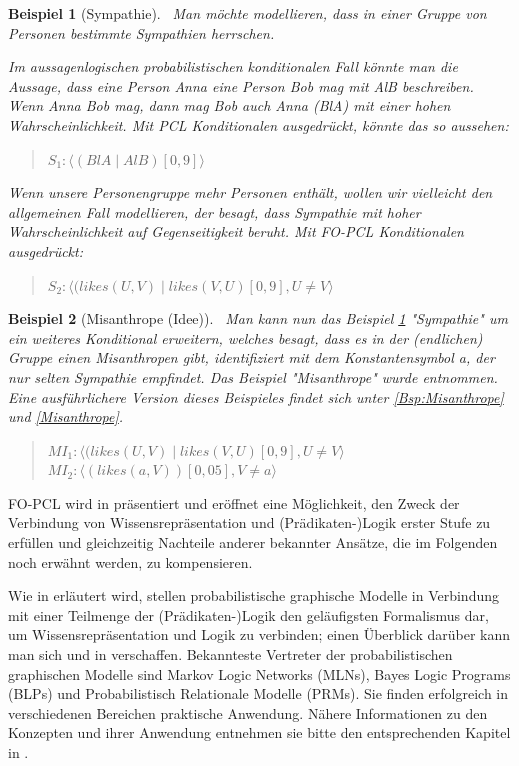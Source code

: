 \documentclass[a4paper, 11pt]{book}
\newtheorem{Bsp}{Beispiel}[section]
\begin{document}
\begin{Bsp}[Sympathie]\label{sec:BspSmp}\
Man möchte modellieren, dass in einer Gruppe von Personen bestimmte Sympathien herrschen.

Im aussagenlogischen probabilistischen konditionalen Fall könnte man die Aussage, dass eine Person Anna eine Person Bob mag mit AlB beschreiben. Wenn Anna Bob mag, dann mag Bob auch Anna (BlA) mit einer hohen Wahrscheinlichkeit.
Mit PCL Konditionalen ausgedrückt, könnte das so aussehen:
\begin{quote}
$ S_{1} : \langle (BlA \mid AlB)[0,9]\rangle$\\
\end{quote}
Wenn unsere Personengruppe mehr Personen enthält, wollen wir vielleicht den allgemeinen Fall modellieren, der besagt, dass Sympathie mit hoher Wahrscheinlichkeit auf Gegenseitigkeit beruht.
Mit FO-PCL Konditionalen ausgedrückt:
\begin{quote}
	$ S_{2} : \langle (likes(U, V) \mid likes(V, U)[0,9], U \neq V \rangle$\\
\end{quote}

\end{Bsp}

\begin{Bsp}[Misanthrope (Idee)]\label{sec:Misanthrop}\
Man kann nun das Beispiel \ref{sec:BspSmp} "{}Sympathie"{} um ein weiteres Konditional erweitern, welches besagt, dass es in der (endlichen) Gruppe einen Misanthropen gibt, identifiziert mit dem Konstantensymbol a, der nur selten Sympathie empfindet. Das Beispiel "{}Misanthrope"{} wurde \cite[Bsp. 6.5.3, S. 144]{Fis10} entnommen. Eine ausführlichere Version dieses Beispieles findet sich unter \ref{Bsp:Misanthrope} und \ref{Misanthrope}.
\begin{quote}
$ MI_1 : \langle (likes(U, V) \mid likes(V, U)[0,9], U \neq V \rangle$\\
$ MI_2 : \langle (likes(a, V))[0,05], V \neq a \rangle$\\
\end{quote}


\end{Bsp}
\newpage
FO-PCL wird in \cite[Kap. 6]{Fis10} präsentiert und eröffnet eine Möglichkeit, den Zweck der Verbindung von Wissensrepräsentation und (Prädikaten-)Logik erster Stufe zu erfüllen und gleichzeitig Nachteile anderer bekannter Ansätze, die im Folgenden noch erwähnt werden, zu kompensieren.     

                            
Wie in \cite[S. 19]{Fis09} erläutert wird, stellen probabilistische graphische Modelle in Verbindung mit einer Teilmenge der (Prädikaten-)Logik den geläufigsten Formalismus dar, um Wissensrepräsentation und Logik zu verbinden; einen Überblick darüber kann man sich \cite{SBAR08} und in \cite[Kap. 10]{GT07} verschaffen. Bekannteste Vertreter der probabilistischen graphischen Modelle sind Markov Logic Networks (MLNs), Bayes Logic Programs (BLPs) und Probabilistisch Relationale Modelle (PRMs). Sie finden erfolgreich in verschiedenen Bereichen praktische Anwendung.
Nähere Informationen zu den Konzepten und ihrer Anwendung entnehmen sie bitte den entsprechenden Kapitel in \cite{GT07}.
\end{document}
